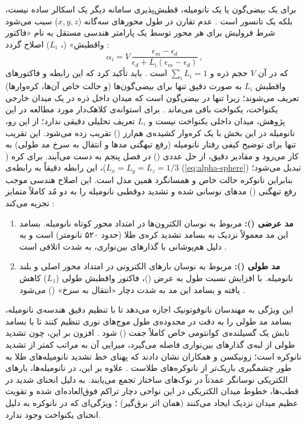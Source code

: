 \documentclass[12pt,a4paper]{report}
\begin{document}
برای یک بیضی‌گون یا یک نانومیله، قطبش‌پذیری سامانه دیگر یک اسکالر ساده نیست، بلکه یک تانسور است \cite{maier,novotny}. عدم تقارن در طول محورهای سه‌گانه ($x,y,z$) سبب می‌شود شرط فرولیش برای هر محور توسط یک پارامتر هندسی مستقل به نام «فاکتور واقطبش» (، $L_i$) اصلاح گردد \cite{maier,novotny,bohren}:
\begin{equation}\label{eq:alpha-i}
\alpha_i=V\,\frac{\epsilon_m-\epsilon_d}{\epsilon_d+L_i(\epsilon_m-\epsilon_d)}\,,
\end{equation}
که در آن $V$ حجم ذره و $\sum_i L_i=1$ است \cite{maier,bohren}. باید تأکید کرد که این رابطه و فاکتورهای واقطبش $L_i$ به صورت دقیق تنها برای بیضی‌گون‌ها (و حالت خاص آن‌ها، کره‌وارها) تعریف می‌شوند؛ زیرا تنها در بیضی‌گون است که میدان داخل ذره در یک میدان خارجی یکنواخت، یکنواخت باقی می‌ماند \cite{bohren}. برای استوانه‌ی کلاهک‌دار مورد مطالعه در این پژوهش، میدان داخلی یکنواخت نیست و $L_i$ تعریف تحلیلی دقیقی ندارد؛ از این رو، نانومیله در این بخش با یک کره‌وار کشیده‌ی هم‌ارز () تقریب زده می‌شود. این تقریب تنها برای توضیح کیفی رفتار نانومیله (رفع تبهگنی مدها و انتقال به سرخ مد طولی) به کار می‌رود و مقادیر دقیق، از حل عددی () در فصل پنجم به دست می‌آیند. برای کره ($L_x=L_y=L_z=1/3$)، این رابطه دقیقاً به رابطه‌ی (\ref{eq:alpha-sphere}) تبدیل می‌شود؛ بنابراین نانوکره حالت خاص و همسانگرد همین مدل است. این اصلاح هندسی موجب رفع تبهگنی () مدهای نوسانی شده و تشدید دوقطبی نانومیله را به دو مُد کاملاً متمایز تجزیه می‌کند \cite{maier,novotny}:
\begin{enumerate}
\item \textbf{مد عرضی ():} مربوط به نوسان الکترون‌ها در امتداد محور کوتاه نانومیله. بسامد این مد معمولاً نزدیک به بسامد تشدید کره‌ی طلا (حدود ۵۲۰ نانومتر) است و به دلیل هم‌پوشانی با گذارهای بین‌نواری، به شدت اتلافی است \cite{maier,novotny,link}.
\item \textbf{مد طولی ():} مربوط به نوسان بارهای الکترونی در امتداد محور اصلی و بلند نانومیله. با افزایش نسبت طول به عرض ()، فاکتور واقطبش طولی ($L_1$) کاهش یافته و بسامد این مد به شدت دچار «انتقال به سرخ» () می‌شود \cite{maier,novotny,link}.
\end{enumerate}
این ویژگی به مهندسان نانوفوتونیک اجازه می‌دهد تا با تنظیم دقیق هندسه‌ی نانومیله، بسامد مد طولی را به دقت در محدوده‌ی طول موج‌های نوری تنظیم کنند تا با بسامد تابش یک گسیلنده‌ی کوانتومی خاص کاملاً جفت () شود \cite{novotny,maier}. افزون بر این، چون تشدید طولی از لبه‌ی گذارهای بین‌نواری فاصله می‌گیرد، میرایی آن به مراتب کمتر از تشدید نانوکره است؛ زونیکسن و همکاران نشان دادند که پهنای خط تشدید نانومیله‌های طلا به طور چشمگیری باریک‌تر از نانوکره‌های طلاست \cite{sonnichsen}. علاوه بر این، در نانومیله‌ها، بارهای الکتریکی نوسانگر عمدتاً در نوک‌های ساختار تجمع می‌یابند. به دلیل انحنای شدید در قطب‌ها، خطوط میدان الکتریکی در این نواحی دچار تراکم فوق‌العاده‌ای شده و تقویت عظیم میدان نزدیک ایجاد می‌کنند (همان اثر برق‌گیر) \cite{novotny,bharadwaj}؛ ویژگی‌ای که در نانوکره به دلیل انحنای یکنواخت وجود ندارد.
\end{document}
